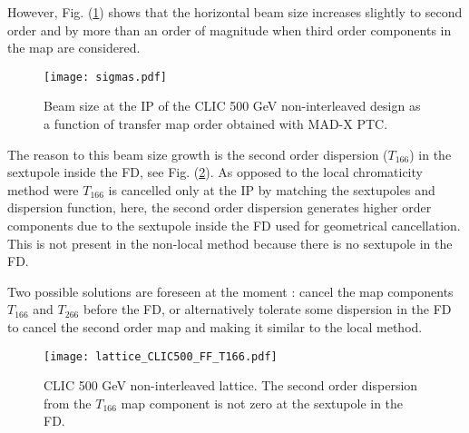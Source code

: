 However, Fig. (\ref{f-beamsize}) shows that the horizontal beam size increases slightly to second order and by more than an order of magnitude when third order components in the map are considered.\par
\begin{figure}[!htb]
   \centering
   \hspace*{-0.6cm}
   \texttt{[image: sigmas.pdf]}
   \caption{Beam size at the IP of the CLIC 500 GeV non-interleaved design as a function of transfer map order obtained with MAD-X PTC.}
   \label{f-beamsize}
\end{figure}
The reason to this beam size growth is the second order dispersion ($T_{166}$) in the sextupole inside the FD, see Fig. (\ref{f-latticeT166}). As opposed to the local chromaticity method were $T_{166}$ is cancelled only at the IP by matching the sextupoles and dispersion function, here, the second order dispersion generates higher order components due to the sextupole inside the FD used for geometrical cancellation. This is not present in the non-local method because there is no sextupole in the FD.\par
Two possible solutions are foreseen at the moment : cancel the map components $T_{166}$ and $T_{266}$ before the FD, or alternatively tolerate some dispersion in the FD to cancel the second order map and making it similar to the local method.\par
\begin{figure}[!htb]
   \centering
   \hspace*{-0.6cm}
   \texttt{[image: lattice\_CLIC500\_FF\_T166.pdf]}
   \caption{CLIC 500 GeV non-interleaved lattice. The second order dispersion from the $T_{166}$ map component is not zero at the sextupole in the FD.}
   \label{f-latticeT166}
\end{figure}
 
